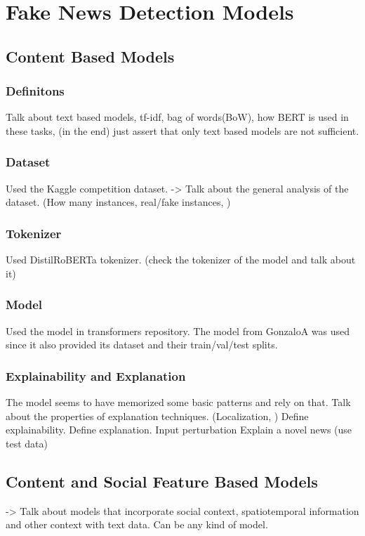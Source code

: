 
\chapter{Fake News Detection Models}\label{chapter:fnd_models}

\section{Content Based Models}

\subsection{Definitons}
Talk about text based models, tf-idf, bag of words(BoW), how BERT is used in these tasks, (in the end) just assert that only text based models are not sufficient.

\subsection{Dataset}
Used the Kaggle competition dataset.
-> Talk about the general analysis of the dataset. (How many instances, real/fake instances, )

\subsection{Tokenizer}
Used DistilRoBERTa tokenizer. (check the tokenizer of the model and talk about it)

\subsection{Model}
Used the model in transformers repository. The model from GonzaloA was used since it also provided its dataset and their train/val/test splits.

\subsection{Explainability and Explanation}
The model seems to have memorized some basic patterns and rely on that.
Talk about the properties of explanation techniques. (Localization, )
Define explainability. Define explanation.
Input perturbation
Explain a novel news (use test data)



\section{Content and Social Feature Based Models}
-> Talk about models that incorporate social context, spatiotemporal information and other context with text data. Can be any kind of model.

